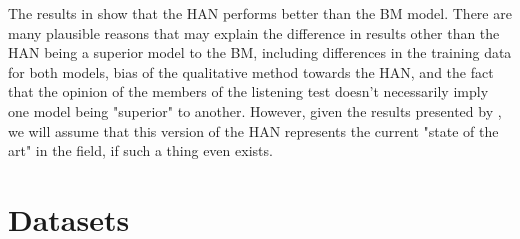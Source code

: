 The results in \cite{jeong2019virtuosonet} show that the HAN performs better than the BM model. There are many plausible reasons that may explain the difference in results other than the HAN being a superior model to the BM, including differences in the training data for both models, bias of the qualitative method towards the HAN, and the fact that the opinion of the members of the listening test doesn't necessarily imply one model being "superior" to another. However, given the results presented by \citet{jeong2019virtuosonet}, we will assume that this version of the HAN represents the current "state of the art" in the field, if such a thing even exists. 


\section{Datasets}
